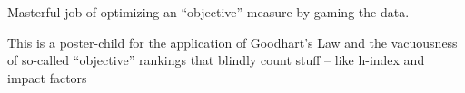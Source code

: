\documentclass[12pt]{sigbovik-review}
\author{Count Dracula, Sesame St, Cyberspace}
\begin{document}
\maketitle

Masterful job of optimizing an ``objective'' measure by gaming the data.

This is a poster-child for the application of Goodhart’s Law and the vacuousness of so-called
``objective'' rankings that blindly count stuff – like h-index and impact factors
\end{document}
